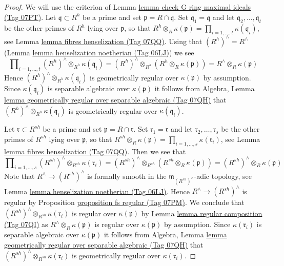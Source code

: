 \documentclass{amsart}
\theoremstyle{plain}
\theoremstyle{definition}
\theoremstyle{remark}
\numberwithin{equation}{subsection}
\begin{document}
\begin{proof}
We will use the criterion of Lemma \href{https://stacks.math.columbia.edu/tag/07PT}{lemma check G ring maximal ideals (Tag 07PT)}.
Let $\mathfrak q \subset R^h$ be a prime and set
$\mathfrak p = R \cap \mathfrak q$. Set $\mathfrak q_1 = \mathfrak q$
and let $\mathfrak q_2, \ldots, \mathfrak q_t$
be the other primes of $R^h$ lying over $\mathfrak p$, so that
$R^h \otimes_R \kappa(\mathfrak p) =
\prod\nolimits_{i = 1, \ldots, t} \kappa(\mathfrak q_i)$, see
Lemma \href{https://stacks.math.columbia.edu/tag/07QQ}{lemma fibres henselization (Tag 07QQ)}.
Using that $(R^h)^\wedge = R^\wedge$
(Lemma \href{https://stacks.math.columbia.edu/tag/06LJ}{lemma henselization noetherian (Tag 06LJ)}) we see
$$
\prod\nolimits_{i = 1, \ldots, t}
(R^h)^\wedge \otimes_{R^h} \kappa(\mathfrak q_i) =
(R^h)^\wedge \otimes_{R^h} (R^h \otimes_R \kappa(\mathfrak p)) =
R^\wedge \otimes_R \kappa(\mathfrak p)
$$
Hence $(R^h)^\wedge \otimes_{R^h} \kappa(\mathfrak q_i)$
is geometrically regular over $\kappa(\mathfrak p)$ by assumption.
Since $\kappa(\mathfrak q_i)$ is separable algebraic over $\kappa(\mathfrak p)$
it follows from Algebra, Lemma
\href{https://stacks.math.columbia.edu/tag/07QH}{lemma geometrically regular over separable algebraic (Tag 07QH)} that
$(R^h)^\wedge \otimes_{R^h} \kappa(\mathfrak q_i)$ is
geometrically regular over $\kappa(\mathfrak q_i)$.

\medskip\noindent
Let $\mathfrak r \subset R^{sh}$ be a prime and set
$\mathfrak p = R \cap \mathfrak r$. Set $\mathfrak r_1 = \mathfrak r$
and let $\mathfrak r_2, \ldots, \mathfrak r_s$
be the other primes of $R^{sh}$ lying over $\mathfrak p$, so that
$R^{sh} \otimes_R \kappa(\mathfrak p) =
\prod\nolimits_{i = 1, \ldots, s} \kappa(\mathfrak r_i)$, see
Lemma \href{https://stacks.math.columbia.edu/tag/07QQ}{lemma fibres henselization (Tag 07QQ)}.
Then we see that
$$
\prod\nolimits_{i = 1, \ldots, s}
(R^{sh})^\wedge \otimes_{R^{sh}} \kappa(\mathfrak r_i) =
(R^{sh})^\wedge \otimes_{R^{sh}} (R^{sh} \otimes_R \kappa(\mathfrak p)) =
(R^{sh})^\wedge \otimes_R \kappa(\mathfrak p)
$$
Note that $R^\wedge \to (R^{sh})^\wedge$ is formally smooth
in the $\mathfrak m_{(R^{sh})^\wedge}$-adic topology, see
Lemma \href{https://stacks.math.columbia.edu/tag/06LJ}{lemma henselization noetherian (Tag 06LJ)}.
Hence $R^\wedge \to (R^{sh})^\wedge$ is regular by
Proposition \href{https://stacks.math.columbia.edu/tag/07PM}{proposition fs regular (Tag 07PM)}.
We conclude that $(R^{sh})^\wedge \otimes_{R^{sh}} \kappa(\mathfrak r_i)$
is regular over $\kappa(\mathfrak p)$ by
Lemma \href{https://stacks.math.columbia.edu/tag/07QI}{lemma regular composition (Tag 07QI)} as
$R^\wedge \otimes_R \kappa(\mathfrak p)$ is regular over $\kappa(\mathfrak p)$
by assumption. Since $\kappa(\mathfrak r_i)$ is separable algebraic over
$\kappa(\mathfrak p)$
it follows from Algebra, Lemma
\href{https://stacks.math.columbia.edu/tag/07QH}{lemma geometrically regular over separable algebraic (Tag 07QH)} that
$(R^{sh})^\wedge \otimes_{R^{sh}} \kappa(\mathfrak r_i)$ is
geometrically regular over $\kappa(\mathfrak r_i)$.
\end{proof}
\end{document}
